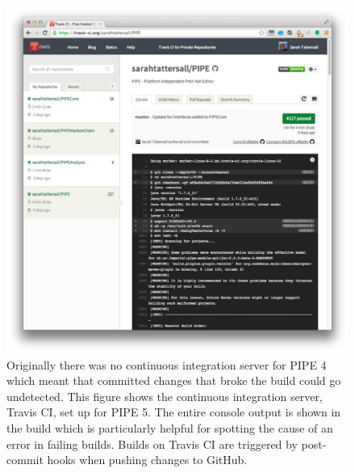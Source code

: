 
\begin{figure}[tb]
\begin{center}
    \includegraphics[width=\linewidth]{build/travis_ci.png} 
    \caption{Originally there was no continuous integration server for PIPE 4 which meant that committed changes that broke the build could go undetected. This figure shows the continuous integration server, Travis CI, set up for PIPE 5. The entire console output is shown in the build which is particularly helpful for spotting the cause of an error in failing builds. Builds on Travis CI are triggered by post-commit hooks when pushing changes to GitHub.}
    \label{fig:travis_ci}
\end{center}
\end{figure}

